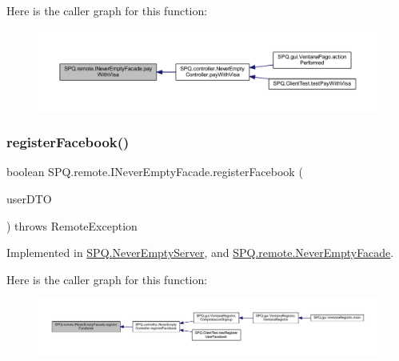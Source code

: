 Here is the caller graph for this function\+:\nopagebreak
\begin{figure}[H]
\begin{center}
\leavevmode
\includegraphics[width=350pt]{interface_s_p_q_1_1remote_1_1_i_never_empty_facade_a3b7058d95e7b73bdcc09220ecfc2d744_icgraph}
\end{center}
\end{figure}
\mbox{\label{interface_s_p_q_1_1remote_1_1_i_never_empty_facade_a7b2f025522489fe9070d09a4fb08f0a1}} 
\subsubsection{\texorpdfstring{register\+Facebook()}{registerFacebook()}}
{\footnotesize\ttfamily boolean S\+P\+Q.\+remote.\+I\+Never\+Empty\+Facade.\+register\+Facebook (\begin{DoxyParamCaption}\item[{\mbox{\hyperlink{class_s_p_q_1_1dto_1_1_user_d_t_o}{User\+D\+TO}}}]{user\+D\+TO }\end{DoxyParamCaption}) throws Remote\+Exception}



Implemented in \mbox{\hyperlink{class_s_p_q_1_1_never_empty_server_abf7e271e0edb91e8f8ed73063de74b03}{S\+P\+Q.\+Never\+Empty\+Server}}, and \mbox{\hyperlink{class_s_p_q_1_1remote_1_1_never_empty_facade_aa9845001ecd5228135d64415a4c12b20}{S\+P\+Q.\+remote.\+Never\+Empty\+Facade}}.

Here is the caller graph for this function\+:\nopagebreak
\begin{figure}[H]
\begin{center}
\leavevmode
\includegraphics[width=350pt]{interface_s_p_q_1_1remote_1_1_i_never_empty_facade_a7b2f025522489fe9070d09a4fb08f0a1_icgraph}
\end{center}
\end{figure}
\mbox{\label{interface_s_p_q_1_1remote_1_1_i_never_empty_facade_a93f3250c09a26fdb1d65219599dfd542}} 
